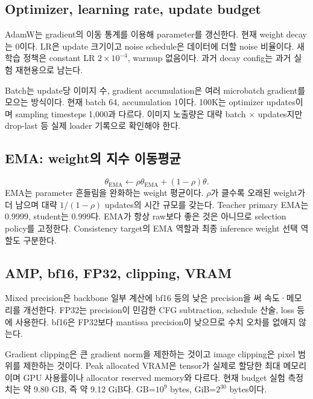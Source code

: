 \documentclass[11pt,a4paper]{article}
\begin{document}
\subsection{Optimizer, learning rate, update budget}
AdamW는 gradient의 이동 통계를 이용해 parameter를 갱신한다. 현재 weight decay는 0이다. LR은 update 크기이고 noise schedule은 데이터에 더할 noise 비율이다. 새 학습 정책은 constant LR $2\times10^{-4}$, warmup 없음이다. 과거 decay config는 과거 실험 재현용으로 남는다.

Batch는 update당 이미지 수, gradient accumulation은 여러 microbatch gradient를 모으는 방식이다. 현재 batch 64, accumulation 1이다. 100K는 optimizer updates이며 sampling timesteps 1,000과 다르다. 이미지 노출량은 대략 batch $\times$ updates지만 drop-last 등 실제 loader 기록으로 확인해야 한다.

\subsection{EMA: weight의 지수 이동평균}
\[
\theta_{\mathrm{EMA}}\leftarrow\rho\theta_{\mathrm{EMA}}+(1-\rho)\theta.
\]
EMA는 parameter 흔들림을 완화하는 weight 평균이다. $\rho$가 클수록 오래된 weight가 더 남으며 대략 $1/(1-\rho)$ updates의 시간 규모를 갖는다. Teacher primary EMA는 0.9999, student는 0.999다. EMA가 항상 raw보다 좋은 것은 아니므로 selection policy를 고정한다. Consistency target의 EMA 역할과 최종 inference weight 선택 역할도 구분한다.

\subsection{AMP, bf16, FP32, clipping, VRAM}
Mixed precision은 backbone 일부 계산에 bf16 등의 낮은 precision을 써 속도·메모리를 개선한다. FP32는 precision이 민감한 CFG subtraction, schedule 산술, loss 등에 사용한다. bf16은 FP32보다 mantissa precision이 낮으므로 수치 오차를 없애지 않는다.

Gradient clipping은 큰 gradient norm을 제한하는 것이고 image clipping은 pixel 범위를 제한하는 것이다. Peak allocated VRAM은 tensor가 실제로 할당한 최대 메모리이며 GPU 사용률이나 allocator reserved memory와 다르다. 현재 budget 실험 측정치는 약 9.80 GB, 즉 약 9.12 GiB다. GB=$10^9$ bytes, GiB=$2^{30}$ bytes이다.
\end{document}
